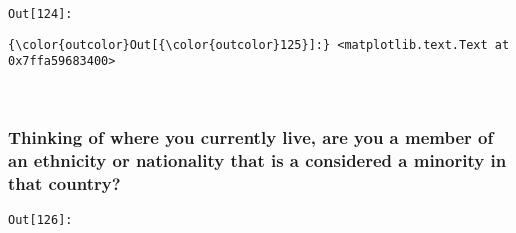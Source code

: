 \documentclass[11pt]{article}
\begin{document}
    

\texttt{\color{outcolor}Out[{\color{outcolor}124}]:}
    

    


            \begin{Verbatim}[commandchars=\\\{\}]
{\color{outcolor}Out[{\color{outcolor}125}]:} <matplotlib.text.Text at 0x7ffa59683400>
\end{Verbatim}
        
    \begin{center}
    \end{center}
    { \hspace*{\fill} \\}
    

    \subsubsection{Thinking of where you currently live, are you a member of
an ethnicity or nationality that is a considered a minority in that
country?}\label{thinking-of-where-you-currently-live-are-you-a-member-of-an-ethnicity-or-nationality-that-is-a-considered-a-minority-in-that-country}

\texttt{\color{outcolor}Out[{\color{outcolor}126}]:}
    
\end{document}
